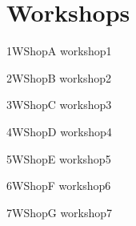 \chapter[Workshops: \daydate]{Workshops}
\thispagestyle{emptyheader}
\vfill




\clearpage
{}

\begin{wsschedule}
  {\WShopNameA}
  {1}{WShopA}
  {workshop1}
  {\WShopLocA}
  
\end{wsschedule}
        
\clearpage
{}

\begin{wsschedule}
  {\WShopNameB}
  {2}{WShopB}
  {workshop2}
  {\WShopLocB}
  
\end{wsschedule}

\begin{wsschedule}
  {\WShopNameC}
  {3}{WShopC}
  {workshop3}
  {\WShopLocC}
  \clearpage
\end{wsschedule}

\begin{wsschedule}
  {\WShopNameD}
  {4}{WShopD}
  {workshop4}
  {\WShopLocD}
  
\end{wsschedule}

\begin{wsschedule}
  {\WShopNameE}
  {5}{WShopE}
  {workshop5}
  {\WShopLocE}
  
\end{wsschedule}

\begin{wsschedule}
  {\WShopNameF}
  {6}{WShopF}
  {workshop6}
  {\WShopLocF}
  
\end{wsschedule}

\begin{wsschedule}
  {\WShopNameG}
  {7}{WShopG}
  {workshop7}
  {\WShopLocG}
  
\end{wsschedule}


